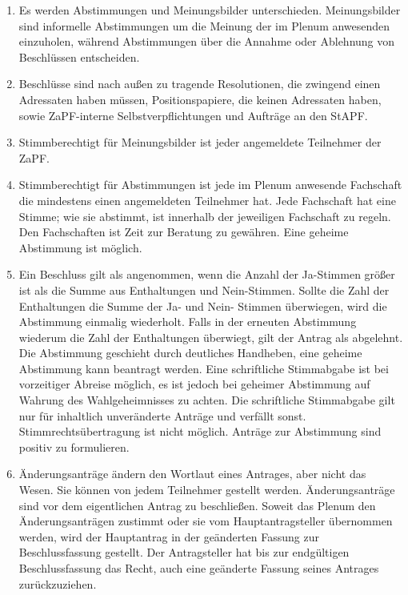 \documentclass[draft,12pt,oneside]{scrreprt}
\begin{document}
\begin{enumerate}
  \item Es werden Abstimmungen und Meinungsbilder unterschieden. Meinungsbilder
        sind informelle Abstimmungen um die Meinung der im Plenum anwesenden
        einzuholen, während Abstimmungen über die Annahme oder Ablehnung von
        Beschlüssen entscheiden.

  \item Beschlüsse sind nach außen zu tragende Resolutionen, die zwingend einen
        Adressaten haben müssen, Positionspapiere, die keinen Adressaten haben,
        sowie ZaPF-interne Selbstverpflichtungen und Aufträge an den StAPF.

  \item Stimmberechtigt für Meinungsbilder ist jeder angemeldete Teilnehmer der
        ZaPF.

  \item Stimmberechtigt für Abstimmungen ist jede im Plenum anwesende Fachschaft
        die mindestens einen angemeldeten Teilnehmer hat.\label{it:stimmberechtigtabstimmungen}
        Jede Fachschaft hat eine Stimme; wie sie abstimmt, ist innerhalb der
        jeweiligen Fachschaft zu regeln.
        Den Fachschaften ist Zeit zur Beratung zu gewähren.
        Eine geheime Abstimmung ist möglich.

  \item Ein Beschluss gilt als angenommen, wenn die Anzahl der Ja-Stimmen größer
        ist als die Summe aus Enthaltungen und Nein-Stimmen.
        Sollte die Zahl der Enthaltungen die Summe der Ja- und Nein- Stimmen
        überwiegen, wird die Abstimmung einmalig wiederholt.
        Falls in der erneuten Abstimmung wiederum die Zahl der Enthaltungen
        überwiegt, gilt der Antrag als abgelehnt.
        Die Abstimmung geschieht durch deutliches Handheben, eine geheime
        Abstimmung kann beantragt werden.
        Eine schriftliche Stimmabgabe ist bei vorzeitiger Abreise möglich, es ist
        jedoch bei geheimer Abstimmung auf Wahrung des Wahlgeheimnisses zu achten.
        Die schriftliche Stimmabgabe gilt nur für inhaltlich unveränderte Anträge
        und verfällt sonst.
        Stimmrechtsübertragung ist nicht möglich.
        Anträge zur Abstimmung sind positiv zu formulieren.

  \item Änderungsanträge ändern den Wortlaut eines Antrages, aber nicht das Wesen.
        Sie können von jedem Teilnehmer gestellt werden.
        Änderungsanträge sind vor dem eigentlichen Antrag zu beschließen.
        Soweit das Plenum den Änderungsanträgen zustimmt oder sie vom
        Hauptantragsteller übernommen werden, wird der Hauptantrag in der
        geänderten Fassung zur Beschlussfassung gestellt.
        Der Antragsteller hat bis zur endgültigen Beschlussfassung das Recht,
        auch eine geänderte Fassung seines Antrages zurückzuziehen.


\end{enumerate}
\end{document}
